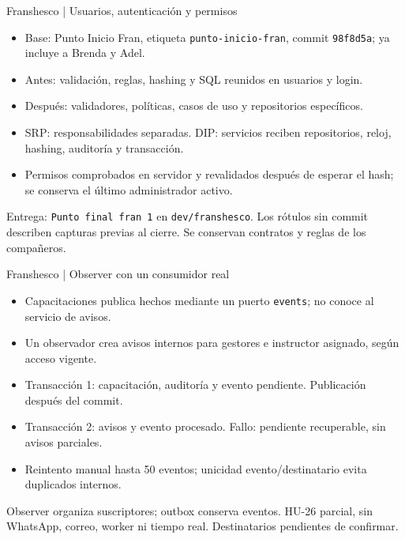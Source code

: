 ﻿%
\begin{frame}{Franshesco | Usuarios, autenticación y permisos}
\begin{itemize}
\item Base: Punto Inicio Fran, etiqueta \texttt{punto-inicio-fran}, commit \texttt{98f8d5a}; ya incluye a Brenda y Adel.
\item Antes: validación, reglas, hashing y SQL reunidos en usuarios y login.
\item Después: validadores, políticas, casos de uso y repositorios específicos.
\item SRP: responsabilidades separadas. DIP: servicios reciben repositorios, reloj, hashing, auditoría y transacción.
\item Permisos comprobados en servidor y revalidados después de esperar el hash; se conserva el último administrador activo.
\end{itemize}
\small Entrega: \texttt{Punto final fran 1} en \texttt{dev/franshesco}. Los rótulos sin commit describen capturas previas al cierre. Se conservan contratos y reglas de los compañeros.
\end{frame}

\begin{frame}{Franshesco | Observer con un consumidor real}
\begin{itemize}
\item Capacitaciones publica hechos mediante un puerto \texttt{events}; no conoce al servicio de avisos.
\item Un observador crea avisos internos para gestores e instructor asignado, según acceso vigente.
\item Transacción 1: capacitación, auditoría y evento pendiente. Publicación después del commit.
\item Transacción 2: avisos y evento procesado. Fallo: pendiente recuperable, sin avisos parciales.
\item Reintento manual hasta 50 eventos; unicidad evento/destinatario evita duplicados internos.
\end{itemize}
\small Observer organiza suscriptores; outbox conserva eventos. HU-26 parcial, sin WhatsApp, correo, worker ni tiempo real. Destinatarios pendientes de confirmar.
\end{frame}

